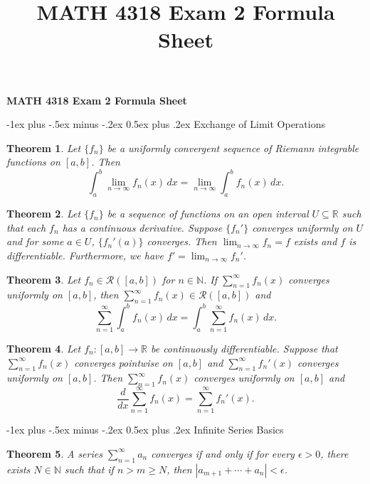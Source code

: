 \documentclass[10pt,landscape]{article}
\title{MATH 4318 Exam 2 Formula Sheet}
\makeatletter
\newtheorem{theorem}{Theorem}
\newcommand{\R}{\mathbb{R}}
\newcommand{\N}{\mathbb{N}}
\renewcommand{\section}{\@startsection{section}{1}{0mm}%
                                {-1ex plus -.5ex minus -.2ex}%
                                {0.5ex plus .2ex}%
                                {\normalfont\large\bfseries}}
\makeatother
\begin{document}
\raggedright
\footnotesize

\begin{center}
     \Large{\textbf{MATH 4318 Exam 2 Formula Sheet}} \\
\end{center}
\begin{multicols}{3}
\setlength{\premulticols}{1pt}
\setlength{\postmulticols}{1pt}
\setlength{\multicolsep}{1pt}
\setlength{\columnsep}{2pt}

\section{Exchange of Limit Operations}
\begin{theorem}
  Let $\{f_n\}$ be a uniformly convergent sequence
  of Riemann integrable functions on $[a, b]$. Then
  \[
    \int_a^b \lim_{n \to \infty} f_n(x)\, dx
    = \lim_{n \to \infty} \int_a^b f_n(x)\, dx.
  \]
\end{theorem}

\begin{theorem}
  Let $\{f_n\}$ be a sequence of functions on an
  open interval $U \subseteq \R$ such that
  each $f_n$ has a continuous derivative. Suppose
  $\{f_n'\}$ converges uniformly on $U$ and for some
  $a \in U$, $\{f_n'(a)\}$ converges. Then
  $\lim_{n \to \infty} f_n = f$ exists and
  $f$ is differentiable. Furthermore, we have
  $f' = \lim_{n \to \infty} f_n'$.
\end{theorem}

\begin{theorem}
  Let $f_n \in \mathcal{R}([a, b])$ for
  $n \in \N$. If $\sum_{n = 1}^\infty f_n(x)$
  converges uniformly on $[a, b]$, then
  $\sum_{n = 1}^\infty f_n(x) \in \mathcal{R}([a, b])$ and
  \[
    \sum_{n = 1}^\infty \int_a^b f_n(x)\, dx
    = \int_a^b \sum_{n = 1}^\infty f_n(x)\, dx.
  \]
\end{theorem}

\begin{theorem}
  Let $f_n : [a, b] \to \R$ be continuously differentiable.
  Suppose that $\sum_{n = 1}^\infty f_n(x)$ converges
  pointwise on $[a, b]$ and $\sum_{n = 1}^\infty f_n'(x)$ converges
  uniformly on $[a, b]$. Then
  $\sum_{n = 1}^\infty f_n(x)$ converges uniformly on $[a, b]$
  and
  \[
    \frac{d}{dx} \sum_{n = 1}^\infty f_n(x)
    = \sum_{n = 1}^\infty f_n'(x).
  \]
\end{theorem}

\section{Infinite Series Basics}
\begin{theorem}
  A series $\sum_{n = 1}^\infty a_n$ converges if and
  only if for every $\epsilon > 0$, there exists
  $N \in \N$ such that if $n > m \ge N$, then
  $|a_{m + 1} + \cdots + a_n| < \epsilon$.
\end{theorem}


\end{multicols}
\end{document}
